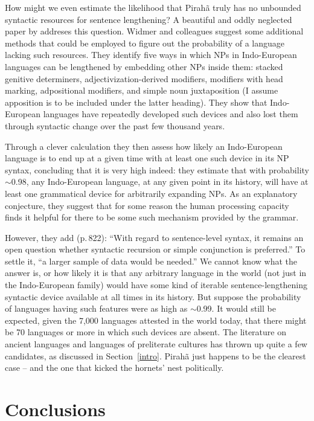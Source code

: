 \documentclass[output=paper,colorlinks,citecolor=brown
]{langscibook}
\begin{document}
How might we even estimate the likelihood that Pirah{\~a} truly has no
unbounded syntactic resources for sentence lengthening? A beautiful
and oddly neglected paper by \citet{WidmerEtAl17} addreses this
question. Widmer and colleagues suggest some additional methods that
could be employed to figure out the probability of a language lacking
such resources. They identify five ways in which NPs in Indo-European
languages can be lengthened by embedding other NPs inside them: stacked
genitive determiners, adjectivization-derived modifiers, modifiers
with head marking, adpositional modifiers, and simple noun
juxtaposition (I assume apposition is to be included under the latter
heading). They show that Indo-European languages have repeatedly
developed such devices and also lost them through syntactic change
over the past few thousand years.

Through a clever calculation they then assess how likely an Indo-European
language is to end up at a given time with at least one such device in
its NP syntax, concluding that it is very high indeed: they estimate
that with probability $\sim$0.98, any Indo-European language, at any
given point in its history, will have at least one grammatical device
for arbitrarily expanding NPs. As an explanatory conjecture, they suggest
that for some reason the human processing capacity finds it helpful for
there to be some such mechanism provided by the grammar.

However, they add (p.\,822): ``With regard to sentence-level syntax,
it remains an open question whether syntactic recursion or simple
conjunction is preferred.'' To settle it, ``a larger sample of data
would be needed.'' We cannot know what the answer is, or how likely
it is that any arbitrary language in the world (not just in the
Indo-European family) would have some kind of iterable
sentence-lengthening syntactic device available at all times in its
history. But suppose the probability of languages having such features
were as high as $\sim$0.99. It would still be expected, given the
7,000 languages attested in the world today, that there might be 70
languages or more in which such devices are absent. The literature
on ancient languages and languages of preliterate cultures has thrown
up quite a few candidates, as discussed in Section~\ref{intro}.
Pirah{\~a} just happens to be the clearest case -- and the one that
kicked the hornets' nest politically.

\section{Conclusions}
\end{document}
